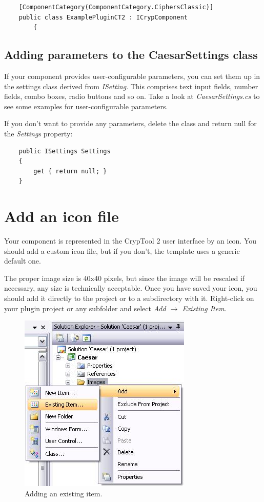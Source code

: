 \begin{lstlisting}
    [ComponentCategory(ComponentCategory.CiphersClassic)]
    public class ExamplePluginCT2 : ICrypComponent
		{
\end{lstlisting}

\subsection{Adding parameters to the CaesarSettings class}
\label{sec:AddingControlsToTheCaesarSettingsClass}

If your component provides user-configurable parameters, you can set them up in the settings class derived from \textit{ISetting}. This comprises text input fields, number fields, combo boxes, radio buttons and so on. Take a look at \textit{CaesarSettings.cs} to see some examples for user-configurable parameters.

If you don't want to provide any parameters, delete the class and return null for the \textit{Settings} property:

\begin{lstlisting}
	public ISettings Settings
	{
		get { return null; }
	}
\end{lstlisting}

\section{Add an icon file}
\label{sec:AddingAnIconToTheCaesarClass}

Your component is represented in the CrypTool 2 user interface by an icon. You should add a custom icon file, but if you don't, the template uses a generic default one.

The proper image size is 40x40 pixels, but since the image will be rescaled if necessary, any size is technically acceptable. Once you have saved your icon, you should add it directly to the project or to a subdirectory with it. Right-click on your plugin project or any subfolder and select \textit{Add $\rightarrow$ Existing Item}.

\begin{figure}[h!]
	\centering
		\includegraphics{figures/add_existing_item.jpg}
	\caption{Adding an existing item.}
	\label{fig:add_existing_item}
\end{figure}
\clearpage

